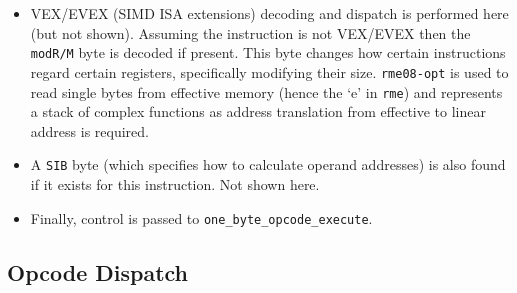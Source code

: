 \documentclass[a4paper]{article}
\begin{document}
\begin{tcolorbox}[breakable]
\begin{itemize}
  \item VEX/EVEX (SIMD ISA extensions) decoding and dispatch is performed here (but not shown).  Assuming the instruction is not VEX/EVEX then the \texttt{modR/M} byte is decoded if present.  This byte changes how certain instructions regard certain registers, specifically modifying their size.  \texttt{rme08-opt} is used to read single bytes from effective memory (hence the `e' in \texttt{rme}) and represents a stack of complex functions as address translation from effective to linear address is required.

  \item A \texttt{SIB} byte (which specifies how to calculate operand addresses) is also found if it exists for this instruction.  Not shown here.

  \item Finally, control is passed to \texttt{one\_byte\_opcode\_execute}.
\end{itemize}

\end{tcolorbox}

\subsection{Opcode Dispatch}
\end{document}
